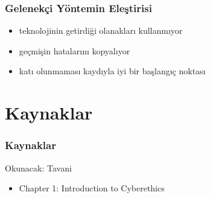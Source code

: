 \documentclass[dvipsnames]{beamer}
\theoremstyle{plain}
\begin{document}
\begin{frame}
  \frametitle{Gelenekçi Yöntemin Eleştirisi}

  \begin{itemize}
    \item teknolojinin getirdiği olanakları kullanmıyor
    \item geçmişin hatalarını kopyalıyor

    \bigskip
    \item katı olunmaması kaydıyla iyi bir başlangıç noktası
  \end{itemize}
\end{frame}

\section*{Kaynaklar}

\begin{frame}
  \frametitle{Kaynaklar}

  \begin{block}{Okunacak: Tavani}
    \begin{itemize}
      \item Chapter 1: \alert{Introduction to Cyberethics}
    \end{itemize}
  \end{block}
\end{frame}
\end{document}
